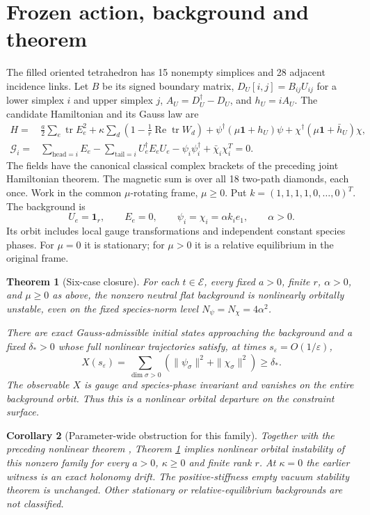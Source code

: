 \documentclass[11pt,a4paper]{article}
\newtheorem{theorem}{Theorem}\newtheorem{lemma}[theorem]{Lemma}\newtheorem{proposition}[theorem]{Proposition}\newtheorem{corollary}[theorem]{Corollary}
\newcommand{\id}{\mathbf1}\newcommand{\tr}{\operatorname{tr}}\newcommand{\diag}{\operatorname{diag}}\newcommand{\Fix}{\operatorname{Fix}}\newcommand{\Rea}{\operatorname{Re}}
\begin{document}
\newpage
\section{Frozen action, background and theorem}
The filled oriented tetrahedron has 15 nonempty simplices and 28 adjacent incidence links. Let $B$ be its signed boundary matrix, $D_U[i,j]=B_{ij}U_{ij}$ for a lower simplex $i$ and upper simplex $j$, $A_U=D_U^\dagger-D_U$, and $h_U=iA_U$. The candidate Hamiltonian and its Gauss law are
\begin{align*}
H={}&\frac a2\sum_e\tr E_e^2+\kappa\sum_d\left(1-\frac1r\Rea\tr W_d\right)
+\psi^\dagger(\mu\id+h_U)\psi+\chi^\dagger(\mu\id+\bar h_U)\chi,\\
\mathcal G_i={}&\sum_{\mathrm{head}=i}E_e-\sum_{\mathrm{tail}=i}U_e^\dagger E_eU_e
-\psi_i\psi_i^\dagger+\bar\chi_i\chi_i^T=0.
\end{align*}
The fields have the canonical classical complex brackets of the preceding joint Hamiltonian theorem. The magnetic sum is over all 18 two-path diamonds, each once. Work in the common $\mu$-rotating frame, $\mu\geq0$. Put $k=(1,1,1,1,0,\ldots,0)^T$. The background is
\[
U_e=\id_r,\qquad E_e=0,\qquad \psi_i=\chi_i=\alpha k_i e_1,
\qquad \alpha>0.
\]
Its orbit includes local gauge transformations and independent constant species phases. For $\mu=0$ it is stationary; for $\mu>0$ it is a relative equilibrium in the original frame.

\begin{theorem}[Six-case closure]\label{th:six}
For each $t\in\mathcal E$, every fixed $a>0$, finite $r$, $\alpha>0$, and $\mu\geq0$ as above, the nonzero neutral flat background is nonlinearly orbitally unstable, even on the fixed species-norm level $N_\psi=N_\chi=4\alpha^2$.

There are exact Gauss-admissible initial states approaching the background and a fixed $\delta_*>0$ whose full nonlinear trajectories satisfy, at times $s_\varepsilon=O(1/\varepsilon)$,
\[
X(s_\varepsilon)=\sum_{\dim\sigma>0}
\left(\|\psi_\sigma\|^2+\|\chi_\sigma\|^2\right)\geq\delta_*.
\]
The observable $X$ is gauge and species-phase invariant and vanishes on the entire background orbit. Thus this is a nonlinear orbital departure on the constraint surface.
\end{theorem}
\begin{corollary}[Parameter-wide obstruction for this family]\label{cor:all}
Together with the preceding nonlinear theorem \cite{NOI}, Theorem \ref{th:six} implies nonlinear orbital instability of this nonzero family for every $a>0$, $\kappa\geq0$ and finite rank $r$. At $\kappa=0$ the earlier witness is an exact holonomy drift. The positive-stiffness empty vacuum stability theorem is unchanged. Other stationary or relative-equilibrium backgrounds are not classified.
\end{corollary}
\end{document}

